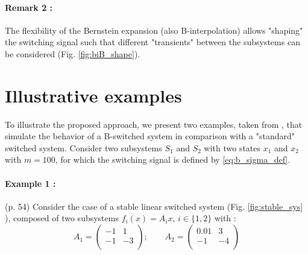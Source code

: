 \documentclass[12pt]{article}
\begin{document}
\paragraph{Remark 2 :} The flexibility of the Bernstein expansion (also B-interpolation) allows "shaping" the switching signal such that different "transients" between the subsystems 
can be considered (Fig. \ref{fig:biB_shape}).

\section{Illustrative examples}

To illustrate the proposed approach, we present two examples, taken from \cite{Bourdais}, that simulate the behavior of a B-switched system in comparison with a "standard" switched 
system. Consider two subsystems $S_1$ and $S_2$ with two states $x_1$ and $x_2$ with $m = 100$, for which the switching signal is defined by \ref{eq:b_sigma_def}.
\paragraph{Example 1 :} (p. 54) Consider the case of a stable linear switched system (Fig. \ref{fig:stable_sys} ), composed of two subsystems 
$f_i(x) = A_i x, \, i \in \{1, 2\}$ with :
\begin{equation}
 A_1 = \left( \begin{array}{cc}
 -1 & 1 \\
 -1 & -3 \\
 \end{array} \right); \qquad
  A_2 = \left( \begin{array}{cc}
 0.01 & 3 \\
 -1 & -4\\
 \end{array} \right)
\end{equation}
\end{document}
